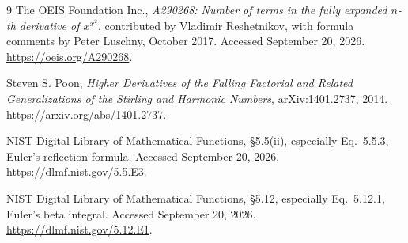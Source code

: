\documentclass[11pt]{article}
\numberwithin{equation}{section}
\theoremstyle{definition}
\theoremstyle{remark}
\begin{document}
\begin{thebibliography}{9}
The OEIS Foundation Inc.,
\emph{A290268: Number of terms in the fully expanded $n$-th derivative of
$x^{x^2}$}, contributed by Vladimir Reshetnikov, with formula comments by
Peter Luschny, October 2017. Accessed September 20, 2026.
\url{https://oeis.org/A290268}.

Steven S. Poon,
\emph{Higher Derivatives of the Falling Factorial and Related
Generalizations of the Stirling and Harmonic Numbers},
arXiv:1401.2737, 2014.
\url{https://arxiv.org/abs/1401.2737}.

NIST Digital Library of Mathematical Functions,
\S5.5(ii), especially Eq.~5.5.3, Euler's reflection formula.
Accessed September 20, 2026.
\url{https://dlmf.nist.gov/5.5.E3}.

NIST Digital Library of Mathematical Functions,
\S5.12, especially Eq.~5.12.1, Euler's beta integral.
Accessed September 20, 2026.
\url{https://dlmf.nist.gov/5.12.E1}.
\end{thebibliography}
\end{document}
